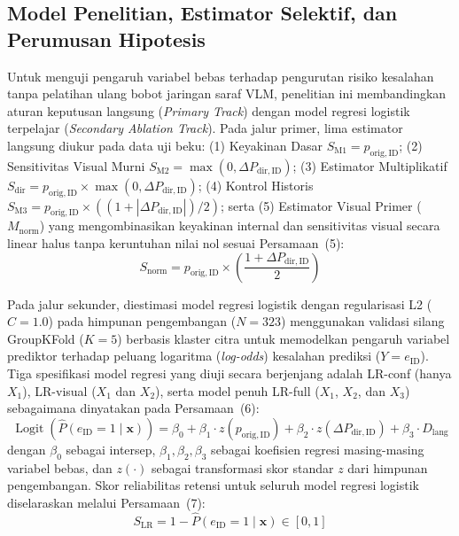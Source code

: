 \documentclass[a4paper,10pt,twoside]{article}
\begin{document}
\subsection{Model Penelitian, Estimator Selektif, dan Perumusan Hipotesis}
Untuk menguji pengaruh variabel bebas terhadap pengurutan risiko kesalahan tanpa pelatihan ulang bobot jaringan saraf VLM, penelitian ini membandingkan aturan keputusan langsung (\textit{Primary Track}) dengan model regresi logistik terpelajar (\textit{Secondary Ablation Track}). Pada jalur primer, lima estimator langsung diukur pada data uji beku: (1) Keyakinan Dasar $S_{\mathrm{M1}} = p_{\mathrm{orig,ID}}$; (2) Sensitivitas Visual Murni $S_{\mathrm{M2}} = \max(0, \Delta P_{\mathrm{dir,ID}})$; (3) Estimator Multiplikatif $S_{\mathrm{dir}} = p_{\mathrm{orig,ID}} \times \max(0, \Delta P_{\mathrm{dir,ID}})$; (4) Kontrol Historis $S_{\mathrm{M3}} = p_{\mathrm{orig,ID}} \times ((1 + |\Delta P_{\mathrm{dir,ID}}|) / 2)$; serta (5) Estimator Visual Primer ($M_{\mathrm{norm}}$) yang mengombinasikan keyakinan internal dan sensitivitas visual secara linear halus tanpa keruntuhan nilai nol sesuai Persamaan~(5):
\begin{equation}
S_{\mathrm{norm}} = p_{\mathrm{orig,ID}} \times \left(\frac{1 + \Delta P_{\mathrm{dir,ID}}}{2}\right)
\end{equation}

Pada jalur sekunder, diestimasi model regresi logistik dengan regularisasi L2 ($C = 1.0$) pada himpunan pengembangan ($N = 323$) menggunakan validasi silang GroupKFold ($K = 5$) berbasis klaster citra untuk memodelkan pengaruh variabel prediktor terhadap peluang logaritma (\textit{log-odds}) kesalahan prediksi ($Y = e_{\mathrm{ID}}$). Tiga spesifikasi model regresi yang diuji secara berjenjang adalah LR-conf (hanya $X_1$), LR-visual ($X_1$ dan $X_2$), serta model penuh LR-full ($X_1$, $X_2$, dan $X_3$) sebagaimana dinyatakan pada Persamaan~(6):
\begin{equation}
\operatorname{Logit}(\hat{P}(e_{\mathrm{ID}} = 1 \mid \mathbf{x})) = \beta_0 + \beta_1 \cdot z(p_{\mathrm{orig,ID}}) + \beta_2 \cdot z(\Delta P_{\mathrm{dir,ID}}) + \beta_3 \cdot D_{\mathrm{lang}}
\end{equation}
dengan $\beta_0$ sebagai intersep, $\beta_1, \beta_2, \beta_3$ sebagai koefisien regresi masing-masing variabel bebas, dan $z(\cdot)$ sebagai transformasi skor standar $z$ dari himpunan pengembangan. Skor reliabilitas retensi untuk seluruh model regresi logistik diselaraskan melalui Persamaan~(7):
\begin{equation}
S_{\mathrm{LR}} = 1 - \hat{P}(e_{\mathrm{ID}} = 1 \mid \mathbf{x}) \in [0, 1]
\end{equation}
\end{document}
